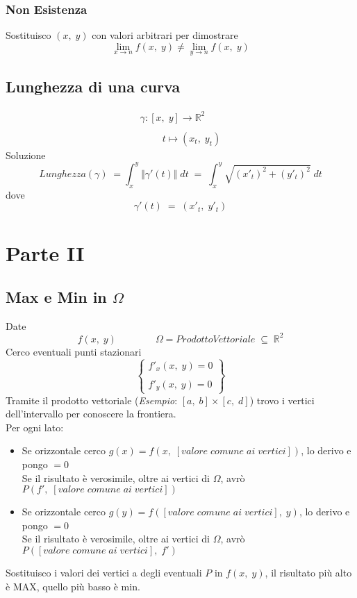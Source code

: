 \documentclass[a4paper, 10pt]{article}
\begin{document}
 				\subsubsection{Non Esistenza}
 					Sostituisco $ (x,\; y) $ con valori arbitrari per dimostrare
 						\[
	 						\lim_{x \to n} f(x,\; y) \neq \lim_{y \to n} f(x,\; y)
 						\]
 						
			\subsection{Lunghezza di una curva}
					\[
						\begin{array}{l}
							\gamma : [x,\; y] \rightarrow \mathbb{R}^2 \\
							\\
							\quad\quad\; t \mapsto (x_t,\; y_t)
						\end{array}
					\]
				Soluzione
					\[
						\mathit{Lunghezza}(\gamma)\; = \int_{x}^{y} \Vert \gamma'(t) \Vert\; dt\; =\; \int_{x}^{y} \sqrt{(x'_t)^2 + (y'_t)^2}\; dt
					\]
				dove
					\[
						\gamma'(t)\; =\; (x'_t,\; y'_t)
					\]
				\newpage
			
		\section{Parte II}
			\subsection{Max e Min in $\Omega$}
				Date
					\[
						f(x,\; y)\quad\quad\quad\quad \Omega = Prodotto Vettoriale\; \subseteq\; \mathbb{R}^2
					\] 
				Cerco eventuali punti stazionari
					\[
						\left\{ 
							\begin{array}{cc} 
								f'_x(x,\; y) = 0 \\
								\\ 
								f'_y(x,\; y) = 0 
							\end{array} 
						\right\}
					\]
				Tramite il prodotto vettoriale (\textit{Esempio}: $ [a,\; b] \times [c,\; d] $) trovo i vertici dell'intervallo per conoscere la frontiera.\\
				Per ogni lato:
					\begin{itemize}
						\item Se orizzontale cerco $ g(x) = f(x,\; [valore\; comune\; ai\; vertici]) $, lo derivo e pongo $ =0 $\\ Se il risultato è verosimile, oltre ai vertici di $\Omega$, avrò $ P(f',\; [valore\; comune\; ai\; vertici]) $
						\item Se orizzontale cerco $ g(y) = f([valore\; comune\; ai\; vertici],\; y) $, lo derivo e pongo $ =0 $\\ 
						Se il risultato è verosimile, oltre ai vertici di $\Omega$, avrò $ P([valore\; comune\; ai\; vertici],\; f') $
					\end{itemize}
				Sostituisco i valori dei vertici a degli eventuali $ P $ in $ f(x,\; y) $, il risultato più alto è MAX, quello più basso è min.
\end{document}
